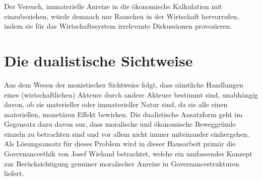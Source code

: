 \documentclass[12pt]{article}
\begin{document}
\FloatBarrier
\noindent Der Versuch, immaterielle Anreize in die ökonomische Kalkulation mit einzubeziehen, würde demnach nur Rauschen in der Wirtschaft hervorrufen, indem sie für das Wirtschaftssystem irrelevante Diskussionen provozieren.
\section{Die dualistische Sichtweise}
Aus dem Wesen der monistischer Sichtweise folgt, dass sämtliche Handlungen eines (wirtschaftlichen) Akteurs durch andere Akteure bestimmt sind, unabhängig davon, ob sie materieller oder immaterieller Natur sind, da sie alle einen materiellen, monetären Effekt bewirken. Die dualistische Ansatzform geht im Gegensatz dazu davon aus, dass moralische und ökonomische Beweggründe einzeln zu betrachten sind und vor allem nicht immer miteinander einhergehen. Als Lösungsansatz für dieses Problem wird in dieser Hausarbeit primär die Governanceethik von Josef Wieland betrachtet, welche ein umfassendes Konzept zur Berücksichtigung genuiner moralischer Anreize in Governancestrukturen liefert.
\end{document}
